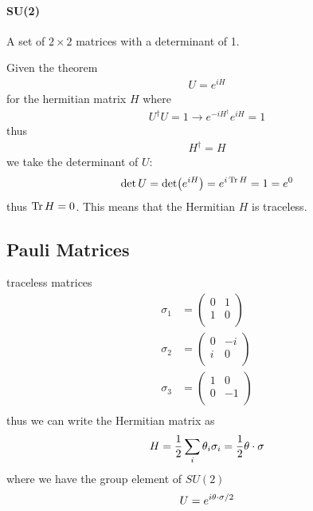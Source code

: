 \documentclass[../main.tex]{subfiles}
\begin{document}
\paragraph{SU(2)} A set of $2 \times 2$ matrices with a determinant of 1.

Given the theorem
\begin{align*}
    U = e^{iH}
\end{align*}
for the hermitian matrix $H$ where
\begin{align*}
    U^\dagger U = 1 \rightarrow e^{-iH^\dagger} e^{iH} = 1
\end{align*}
thus
\begin{align*}
    H^\dagger = H
\end{align*}
we take the determinant of $U$:
\begin{align*}
    \det U = \det(e^{iH}) = e^{i\Tr H} = 1 = e^0
\end{align*}
thus $\Tr H = 0$. This means that the Hermitian $H$ is traceless.

\subsection*{Pauli Matrices} traceless matrices
\begin{align*}
    \sigma_1 &= \begin{pmatrix}
        0 & 1 \\
        1 & 0 \\
    \end{pmatrix} \\
    \sigma_2 &= \begin{pmatrix}
        0 & -i \\
        i & 0 \\
    \end{pmatrix} \\
    \sigma_3 &= \begin{pmatrix}
        1 & 0 \\
        0 & -1 \\
    \end{pmatrix} \\
\end{align*}
thus we can write the Hermitian matrix as
\begin{align*}
    H = \frac{1}{2} \sum_i \theta_i \sigma_i = \frac{1}{2} \vb{\theta} \cdot \vb{\sigma}
\end{align*}
where we have the group element of $SU(2)$
\begin{align*}
    U = e^{i \vb\theta \cdot \vb\sigma/2}
\end{align*}
\end{document}

